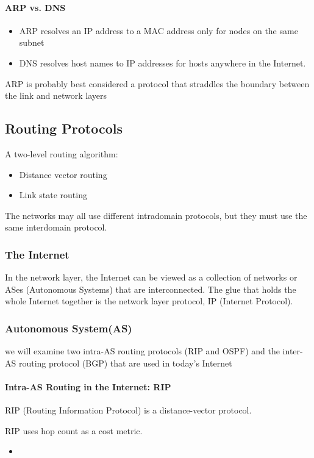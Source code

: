 \paragraph{ARP vs. DNS}\quad
\begin{itemize}
    \item ARP resolves an IP address to a MAC address only for nodes on
    the same subnet
    \item DNS resolves host names to IP addresses for hosts anywhere in the
    Internet.
\end{itemize}
ARP is probably best considered a protocol that straddles the boundary between the link and network layers

\subsection{Routing Protocols}
A two-level routing algorithm:
\begin{itemize}
    \item Distance vector routing
    \item Link state routing
\end{itemize}
The networks may all use different intradomain protocols, but they must use the same interdomain protocol. 

\subsubsection{The Internet}
In the network layer, the Internet can be viewed as a collection of networks or ASes (Autonomous Systems) that are interconnected. The glue that holds the whole Internet together is the network layer
protocol, IP (Internet Protocol).

\subsubsection{Autonomous System(AS)}
we will examine two intra-AS routing
protocols (RIP and OSPF) and the inter-AS routing
protocol (BGP) that are used in today's Internet

\paragraph{Intra-AS Routing in the Internet: RIP}RIP (Routing Information Protocol) is a distance-vector protocol. 

RIP uses hop count as a cost metric. %
\begin{itemize}
    \item 
\end{itemize}

